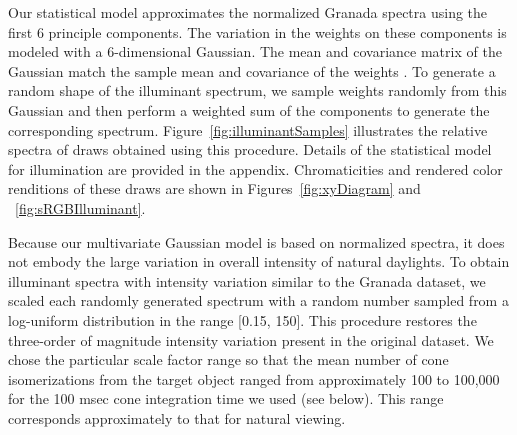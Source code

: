 \documentclass{jov}
\begin{document}
Our statistical model approximates the normalized Granada spectra using the first 6 principle components.
The variation in the weights on these components is modeled with a 6-dimensional Gaussian.
The mean and covariance matrix of the Gaussian match the sample mean and covariance of the weights \cite{BrainardFreeman}. 
To generate a random shape of the illuminant spectrum, we sample weights randomly from this Gaussian and then perform a weighted sum of the components to generate the corresponding spectrum.
Figure~\ref{fig:illuminantSamples} illustrates the relative spectra of draws obtained using this procedure.
Details of the statistical model for illumination are provided in the appendix.
Chromaticities and rendered color renditions of these draws are shown in Figures~\ref{fig:xyDiagram} and ~\ref{fig:sRGBIlluminant}.

Because our multivariate Gaussian model is based on normalized spectra, it does not embody the large variation in overall intensity of natural daylights.
To obtain illuminant spectra with intensity variation similar to the Granada dataset, we scaled each randomly generated spectrum with a random number sampled from a log-uniform distribution in the range [0.15, 150].
This procedure restores the three-order of magnitude intensity variation present in the original dataset.
We chose the particular scale factor range so that the mean number of cone isomerizations from the target object ranged from approximately 100 to 100,000 for the 100 msec cone integration time we used (see below).
This range corresponds approximately to that for natural viewing.
\end{document}
